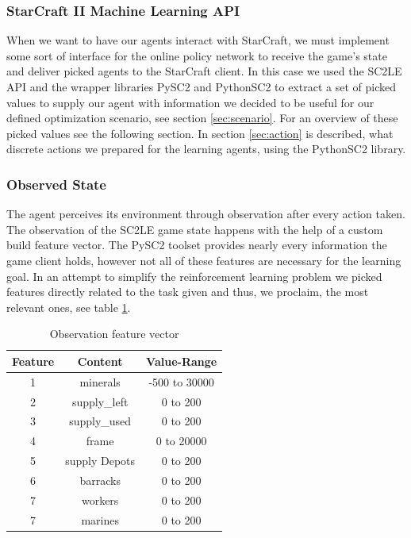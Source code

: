 \documentclass[12pt,a4paper]{article}
\begin{document}
\subsubsection{StarCraft II Machine Learning API}
When we want to have our agents interact with StarCraft, we must implement some sort of interface for the online policy network to receive the game's state and deliver picked agents to the StarCraft client. In this case we used the SC2LE API and the wrapper libraries PySC2 and PythonSC2 to extract a set of picked values to supply our agent with information we decided to be useful for our defined optimization scenario, see section \ref{sec:scenario}. For an overview of these picked values see the following section. In section \ref{sec:action} is described, what discrete actions we prepared for the learning agents, using the PythonSC2 library.
\subsubsection{Observed State}
The agent perceives its environment through observation after every action taken. The observation of the SC2LE game state happens with the help of a custom build feature vector. The PySC2 toolset provides nearly every information the game client holds, however not all of these features are necessary for the learning goal. In an attempt to simplify the reinforcement learning problem we picked features directly related to the task given and thus, we proclaim, the most relevant ones, see table \ref{tab:observation}.
\begin{table}
    \begin{center}
        \begin{tabular}{ | c | c || c | }
            \hline
            {\bf Feature} & {\bf Content} & {\bf Value-Range} \\
            \hline
            1 & minerals & -500 to 30000\\ 
            \hline
            2 & supply\_left & 0 to 200 \\  
            \hline
            3 & supply\_used & 0 to 200 \\
            \hline
            4 & frame & 0 to 20000 \\
            \hline
            5 & supply Depots & 0 to 200 \\
            \hline
            6 & barracks & 0 to 200 \\
            \hline
            7 & workers & 0 to 200 \\
            \hline
            7 & marines & 0 to 200 \\
            \hline
        \end{tabular}
    \end{center}
    \caption{Observation feature vector}
    \label{tab:observation}
\end{table}
\end{document}
